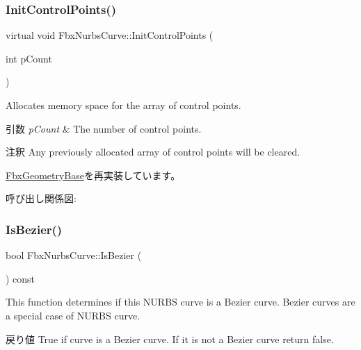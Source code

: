 \subsubsection{\texorpdfstring{Init\+Control\+Points()}{InitControlPoints()}\hspace{0.1cm}{\footnotesize\ttfamily [2/2]}}
{\footnotesize\ttfamily virtual void Fbx\+Nurbs\+Curve\+::\+Init\+Control\+Points (\begin{DoxyParamCaption}\item[{int}]{p\+Count }\end{DoxyParamCaption})\hspace{0.3cm}{\ttfamily [virtual]}}

Allocates memory space for the array of control points. 
\begin{DoxyParams}{引数}
{\em p\+Count} & The number of control points. \\
\hline
\end{DoxyParams}
\begin{DoxyRemark}{注釈}
Any previously allocated array of control points will be cleared. 
\end{DoxyRemark}


\hyperlink{class_fbx_geometry_base_a471b736f2595c006a338c07a61907127}{Fbx\+Geometry\+Base}を再実装しています。

呼び出し関係図\+:
\mbox{\label{class_fbx_nurbs_curve_a7ccb15bbffaf02d3141ae86d10cf633d}} 
\subsubsection{\texorpdfstring{Is\+Bezier()}{IsBezier()}}
{\footnotesize\ttfamily bool Fbx\+Nurbs\+Curve\+::\+Is\+Bezier (\begin{DoxyParamCaption}{ }\end{DoxyParamCaption}) const}

This function determines if this N\+U\+R\+BS curve is a Bezier curve. Bezier curves are a special case of N\+U\+R\+BS curve. \begin{DoxyReturn}{戻り値}
{\ttfamily True} if curve is a Bezier curve. If it is not a Bezier curve return {\ttfamily false}. 
\end{DoxyReturn}
\mbox{\label{class_fbx_nurbs_curve_a197e8df6c4d4e4773c485c0aec5ce593}} 
